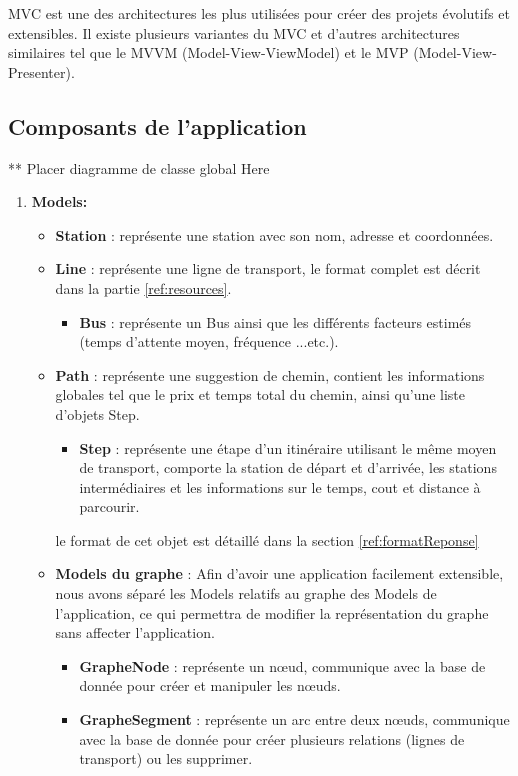 	MVC est une des architectures les plus utilisées pour créer des projets évolutifs et extensibles.	Il existe plusieurs variantes du MVC et d'autres architectures similaires tel que le MVVM (Model-View-ViewModel) et le MVP (Model-View-Presenter).
	\cite{refMVC}
	\subsection{Composants de l'application}
	** Placer diagramme de classe global Here
	
	\begin{enumerate}
	\item \textbf{Models:}
	 \begin{itemize}
		\item \textbf{Station} : représente une station avec son nom, adresse et coordonnées.
		\item \textbf{Line} : représente une ligne de transport, le format complet est décrit dans la partie \ref{ref:resources}.
			\begin{itemize}
			\item \textbf{Bus} : représente un Bus ainsi que les différents facteurs estimés (temps d'attente moyen, fréquence ...etc.).
			\end{itemize}
		\item \textbf{Path} : représente une suggestion de chemin, contient les informations globales tel que le prix et temps total du chemin, ainsi qu'une liste d'objets Step.
			\begin{itemize}
			\item \textbf{Step} : représente une étape d'un itinéraire utilisant le même moyen de transport, comporte la station de départ et d'arrivée, les stations intermédiaires et les informations sur le temps, cout et distance à parcourir.
			\end{itemize}
			le format de cet objet est détaillé dans la section \ref{ref:formatReponse}
		\item \textbf{Models du graphe} : 
		Afin d'avoir une application facilement extensible, nous avons séparé les Models relatifs au graphe des Models de l'application, ce qui permettra de modifier la représentation du graphe sans affecter l'application.
			\begin{itemize}
			\item \textbf{GrapheNode} : représente un nœud, communique avec la base de donnée pour créer et manipuler les nœuds.
			\item \textbf{GrapheSegment} : représente un arc entre deux nœuds, communique avec la base de donnée pour créer plusieurs relations (lignes de transport) ou les supprimer.
			\end{itemize}
	\end{itemize}
	

\end{enumerate}
